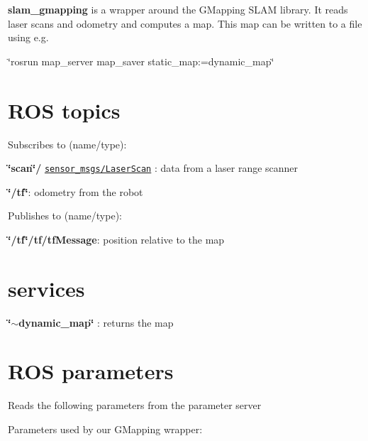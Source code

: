 

{\bfseries slam\+\_\+gmapping} is a wrapper around the G\+Mapping S\+L\+AM library. It reads laser scans and odometry and computes a map. This map can be written to a file using e.\+g.

\char`\"{}rosrun map\+\_\+server map\+\_\+saver static\+\_\+map\+:=dynamic\+\_\+map\char`\"{}



\hypertarget{index_topic}{}\section{R\+O\+S topics}\label{index_topic}
Subscribes to (name/type)\+:
\begin{DoxyItemize}
\item {\bfseries \char`\"{}scan\char`\"{}/} \href{../../sensor_msgs/html/classstd__msgs_1_1LaserScan.html}{\tt sensor\+\_\+msgs/\+Laser\+Scan} \+: data from a laser range scanner
\item {\bfseries \char`\"{}/tf\char`\"{}}\+: odometry from the robot
\end{DoxyItemize}

Publishes to (name/type)\+:
\begin{DoxyItemize}
\item {\bfseries \char`\"{}/tf\char`\"{}/tf/tf\+Message}\+: position relative to the map
\end{DoxyItemize}\hypertarget{index_services}{}\section{services}\label{index_services}

\begin{DoxyItemize}
\item {\bfseries \char`\"{}$\sim$dynamic\+\_\+map\char`\"{}} \+: returns the map
\end{DoxyItemize}\hypertarget{index_parameters}{}\section{R\+O\+S parameters}\label{index_parameters}
Reads the following parameters from the parameter server

Parameters used by our G\+Mapping wrapper\+:


